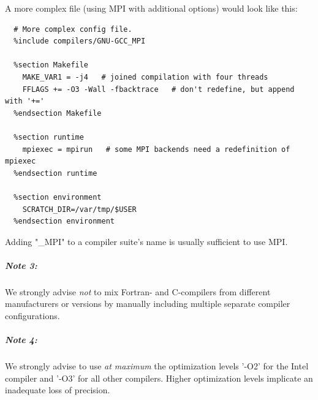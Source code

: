 \documentclass[\mydriver,12pt,twoside,notitlepage,a4paper]{article}
\begin{document}
A more complex file (using MPI with additional options) would look like this:
\begin{verbatim}
  # More complex config file.
  %include compilers/GNU-GCC_MPI

  %section Makefile
    MAKE_VAR1 = -j4   # joined compilation with four threads
    FFLAGS += -O3 -Wall -fbacktrace   # don't redefine, but append with '+='
  %endsection Makefile

  %section runtime
    mpiexec = mpirun   # some MPI backends need a redefinition of mpiexec
  %endsection runtime

  %section environment
    SCRATCH_DIR=/var/tmp/$USER
  %endsection environment
\end{verbatim}
Adding "_MPI" to a compiler suite's name is usually sufficient to use MPI.

\subparagraph{Note 3:}
We strongly advise \emph{not} to mix Fortran- and C-compilers from different
manufacturers or versions by manually including multiple separate compiler
configurations.

\subparagraph{Note 4:}
We strongly advise to use \emph{at maximum} the optimization levels '-O2' for
the Intel compiler and '-O3' for all other compilers. Higher optimization
levels implicate an inadequate loss of precision.
\end{document}
